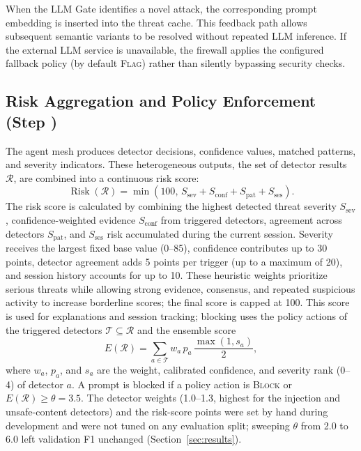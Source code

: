 \documentclass[runningheads]{llncs}
\newif\ifrev
\newcommand{\rev}[1]{\ifrev\hl{#1}\else#1\fi}                  %
\newcommand{\revm}[1]{\ifrev\colorbox{yellow}{$#1$}\else#1\fi} %
\begin{document}
When the LLM Gate identifies a novel attack, the corresponding prompt embedding is inserted into the threat cache. This feedback path allows subsequent semantic variants to be resolved without repeated LLM inference. If the external LLM service is unavailable, the firewall applies the configured fallback policy \rev{(by default \textsc{Flag})} rather than silently bypassing security checks.

\subsection{Risk Aggregation and Policy Enforcement (Step )}\label{sec:risk_agg}
The agent mesh produces detector decisions, confidence values, matched patterns, and severity indicators. These heterogeneous outputs\rev{, the set of detector results $\mathcal{R}$,} are combined into a continuous risk score:
\begin{equation}
\operatorname{Risk}(\mathcal{R})
=
\min
\left(
100,\,
S_{\mathrm{sev}}
+
S_{\mathrm{conf}}
+
S_{\mathrm{pat}}
+
S_{\mathrm{ses}}
\right).
\label{eq:risk}
\end{equation}
The risk score is calculated by combining the highest detected threat severity $S_{\mathrm{sev}}$, confidence-weighted evidence $S_{\mathrm{conf}}$ from triggered detectors, agreement across detectors $S_{\mathrm{pat}}$, and $S_{\mathrm{ses}}$ risk accumulated during the current session. Severity receives the largest fixed base value (0--85), confidence contributes up to 30 points, detector agreement adds 5 points per trigger (up to a maximum of 20), and session history accounts for up to 10. These heuristic weights prioritize serious threats while allowing strong evidence, consensus, and repeated suspicious activity to increase borderline scores; the final score is capped at 100. \rev{This score is used for explanations and session tracking; blocking uses the policy actions of the triggered detectors $\mathcal{T}\subseteq\mathcal{R}$ and the ensemble score}
\begin{equation}
\revm{\displaystyle E(\mathcal{R})=\sum_{a\in\mathcal{T}}w_a\,p_a\,\frac{\max(1,s_a)}{2},}
\label{eq:ensemble}
\end{equation}
\rev{where $w_a$, $p_a$, and $s_a$ are the weight, calibrated confidence, and severity rank (0--4) of detector $a$. A prompt is blocked if a policy action is \textsc{Block} or $E(\mathcal{R})\geq\theta=3.5$. The detector weights (1.0--1.3, highest for the injection and unsafe-content detectors) and the risk-score points were set by hand during development and were not tuned on any evaluation split; sweeping $\theta$ from 2.0 to 6.0 left validation F1 unchanged (Section~\ref{sec:results}).}
\end{document}
